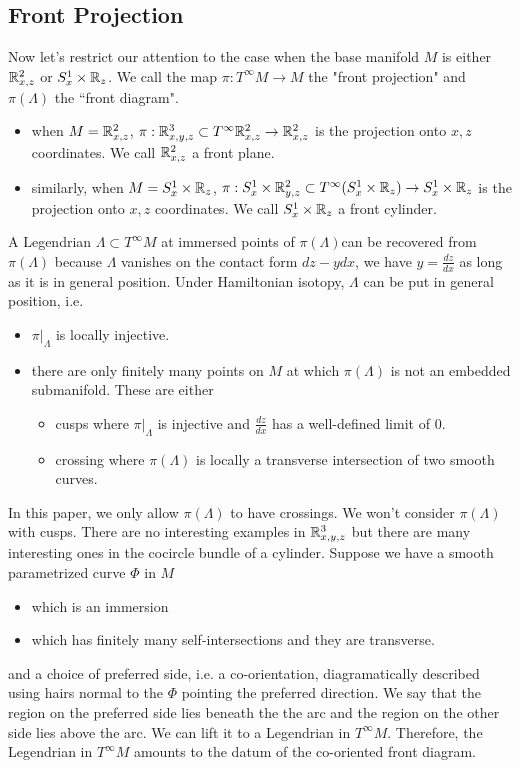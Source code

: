 \subsection*{Front Projection}
Now let's restrict our attention to the case when the base manifold $M$ is either $\mathbb{R}^2_{x,z}$ or $S^1_x \times \mathbb{R}_z$. We call the map $\pi : T^\infty M \rightarrow M$ the "front projection" and $\pi(\Lambda)$ the ``front diagram".
\begin{itemize}
\item when $M = \mathbb{R}^2_{x,z}$, $\pi : \mathbb{R}^3_{x,y,z} \subset T^\infty \mathbb{R}^2_{x,z} \rightarrow \mathbb{R}^2_{x,z}$ is the projection onto $x,z$ coordinates. We call $\mathbb{R}^2_{x,z}$ a front plane.

\item similarly, when $M = S^1_x \times \mathbb{R}_{z}$, $\pi : S^1_x \times \mathbb{R}^2_{y,z} \subset T^\infty (S^1_x \times \mathbb{R}_{z}) \rightarrow S^1_x \times \mathbb{R}_{z}$ is the projection onto $x,z$ coordinates. We call $S^1_x \times \mathbb{R}_{z}$ a front cylinder.
\end{itemize}
A Legendrian $\Lambda \subset T^{\infty}M$ at immersed points of $\pi(\Lambda)$can be recovered from $\pi(\Lambda)$ because $\Lambda$ vanishes on the contact form $dz-ydx$, we have $y = \frac{dz}{dx}$ as long as it is in general position. Under Hamiltonian isotopy, $\Lambda$ can be put in general position, i.e.
\begin{itemize}
\item $\pi|_\Lambda$ is locally injective.

\item there are only finitely many points on $M$ at which $\pi(\Lambda)$ is not an embedded submanifold. These are either
\begin{itemize}
\item cusps where $\pi|_{\Lambda}$ is injective and $\frac{dz}{dx}$ has a well-defined limit of $0$.

\item crossing where $\pi(\Lambda)$ is locally a transverse intersection of two smooth curves.
\end{itemize}
\end{itemize}
In this paper, we only allow $\pi(\Lambda)$ to have crossings. We won't consider $\pi(\Lambda)$ with cusps. There are no interesting examples in $\mathbb{R}^3_{x,y,z}$ but there are many interesting ones in the cocircle bundle of a cylinder.
Suppose we have a smooth parametrized curve $\Phi$ in $M$
\begin{itemize}
\item which is an immersion

\item which has finitely many self-intersections and they are transverse.
\end{itemize}
and a choice of preferred side, i.e. a co-orientation, diagramatically described using hairs normal to the $\Phi$ pointing the preferred direction. We say that the region on the preferred side lies beneath the  the arc and the region on the other side lies above the arc. We can lift it to a Legendrian in $T^{\infty}M$. Therefore, the Legendrian in $T^{\infty}M$ amounts to the datum of the co-oriented front diagram.

